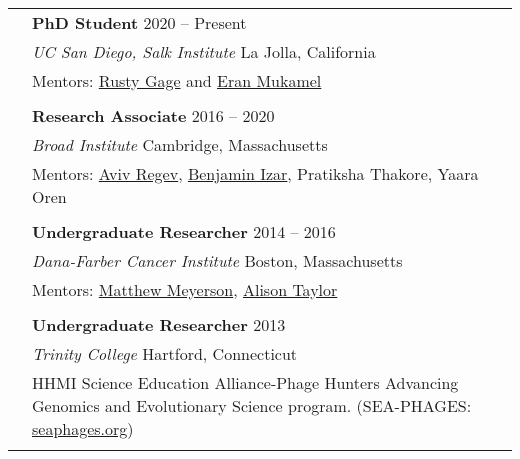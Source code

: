 \documentclass[letterpaper, 11pt]{article}
\begin{document}
\begin{longtable}{p{1.6in}p{4.9in}}

{\color{OliveGreen}{Research experience}}
& \textbf{PhD Student} \hfill 2020 -- Present   \\
& \textit{UC San Diego, Salk Institute} \hfill La Jolla, California \\
& Mentors: \href{https://www.salk.edu/scientist/rusty-gage/}{Rusty Gage} and \href{https://cogsci.ucsd.edu/people/faculty/eran-mukamel.html}{Eran Mukamel} \\
& \\

& \textbf{Research Associate} \hfill 2016 -- 2020  \\
& \textit{Broad Institute} \hfill Cambridge, Massachusetts \\
& Mentors: \href{https://www.roche.com/about/leadership/aviv-regev}{Aviv Regev}, 
\href{https://www.cancer.columbia.edu/profile/benjamin-izar-md}{Benjamin Izar}, 
Pratiksha Thakore, 
Yaara Oren \\
& \\

& \textbf{Undergraduate Researcher} \hfill 2014 -- 2016\\
& \textit{Dana-Farber Cancer Institute}  \hfill Boston, Massachusetts\\
& Mentors: \href{https://meyersonlab.dana-farber.org/matthew-meyerson.html}{Matthew Meyerson}, 
\href{https://www.cancer.columbia.edu/profile/alison-taylor-phd}{Alison Taylor}  \\
& \\

& \textbf{Undergraduate Researcher} \hfill 2013 \\
& \textit{Trinity College} \hfill Hartford, Connecticut \\
& HHMI Science Education Alliance-Phage Hunters Advancing Genomics and Evolutionary Science program. 
(SEA-PHAGES: \href{https://seaphages.org/}{seaphages.org}) \\
& \\


\end{longtable} %
\end{document}
